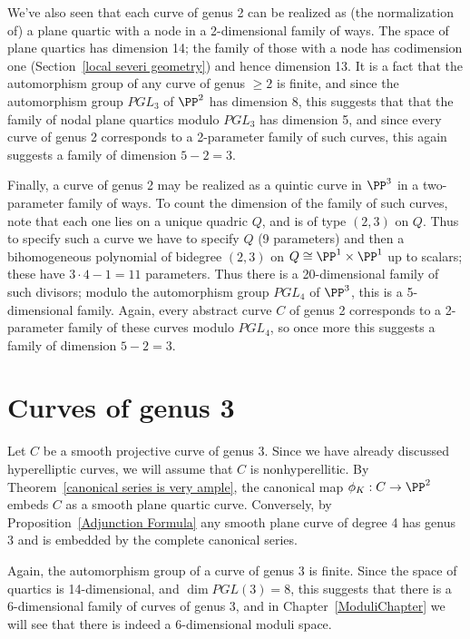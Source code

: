 We've also seen that each curve of genus 2 can be realized as (the normalization of) a plane quartic  with a node in a 2-dimensional family of ways. The space of plane quartics has dimension 14; the family of those with a node has codimension one (Section~\ref{local severi geometry}) and hence dimension 13. It is a fact that the automorphism group of any curve of genus $\geq 2$ is finite, and since  the automorphism group $PGL_3$ of $\PP^2$ has dimension 8, this suggests that that the family of nodal plane quartics modulo $PGL_3$ has dimension 5, and since every curve of genus 2 corresponds to a 2-parameter family of such curves, this again suggests a family of dimension $ 5-2=3$.

Finally, a curve of genus 2 may be realized as a quintic curve in $\PP^3$ in a two-parameter family of ways. To count the dimension of the family of such curves, note that each one lies on a unique quadric $Q$, and is of type $(2,3)$ on $Q$. Thus to specify such a curve we have to specify $Q$ (9 parameters) and then a bihomogeneous polynomial of bidegree $(2,3)$ on $Q \cong \PP^1 \times \PP^1$ up to scalars; these have $3\cdot 4 - 1 = 11$ parameters. Thus there is a 20-dimensional family of such divisors; modulo the automorphism group $PGL_4$ of $\PP^3$, this is a 5-dimensional family. Again, every abstract curve $C$ of genus 2 corresponds to a 2-parameter family of these curves modulo $PGL_4$, so once more this suggests a family of dimension $ 5 - 2 = 3$.

\section{Curves of genus 3}

Let $C$ be a smooth projective curve of genus 3. Since we have already discussed hyperelliptic curves, 
we will assume  that $C$ is nonhyperellitic. By  Theorem~\ref{canonical series is very ample}, the canonical map $\phi_K : C \to \PP^2$ embeds $C$ as a smooth plane quartic curve. Conversely, by Proposition~\ref{Adjunction Formula} any smooth plane curve of degree 4 has genus 3 and is embedded by the complete canonical series. 

Again, the automorphism group of a curve of genus 3 is finite. Since the space of quartics is 14-dimensional, and $\dim PGL(3) = 8$, this suggests that
there is a 6-dimensional family of curves of genus 3, and in Chapter~\ref{ModuliChapter}
we will see that there is indeed a 6-dimensional moduli space.

